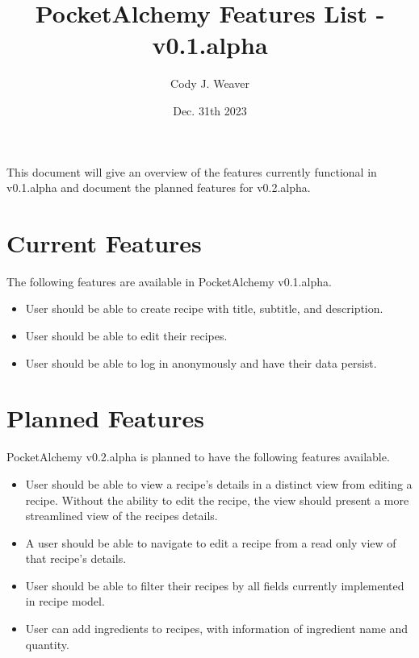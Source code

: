 \documentclass[12pt]{article}
\begin{document}
\title{PocketAlchemy Features List - v0.1.alpha}
\author{Cody J. Weaver}
\date{Dec. 31th 2023}
\maketitle

\begin{center}
    \indent This document will give an overview of the features currently functional in 
    v0.1.alpha and document the planned features for v0.2.alpha.

    \section*{Current Features}

    \indent The following features are available in PocketAlchemy
    v0.1.alpha.

    \begin{itemize}
        \item User should be able to create recipe with title, 
        subtitle, and description.

        \item User should be able to edit their recipes.
        
        \item User should be able to log in anonymously and have their
        data persist.
    \end{itemize}

    \section*{Planned Features}

    \indent PocketAlchemy v0.2.alpha is planned to have the following
    features available.

    \begin{itemize}
        \item User should be able to view a recipe's details 
        in a distinct view from editing a recipe. Without the ability
        to edit the recipe, the view should present a more streamlined view of 
        the recipes details. 

        \item A user should be able to navigate to edit a recipe from a
        read only view of that recipe's details.

        \item User should be able to filter their recipes by all fields 
        currently implemented in recipe model.

        \item User can add ingredients to recipes, with information 
        of ingredient name and quantity.


    \end{itemize}

\end{center}
\end{document}
